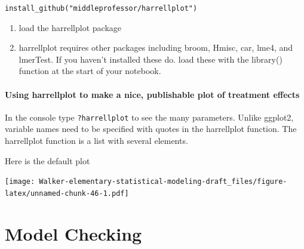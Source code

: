 \documentclass[]{book}
\newenvironment{Shaded}{\begin{snugshade}}{\end{snugshade}}
\newcommand{\KeywordTok}[1]{\textcolor[rgb]{0.13,0.29,0.53}{\textbf{#1}}}
\newcommand{\DataTypeTok}[1]{\textcolor[rgb]{0.13,0.29,0.53}{#1}}
\newcommand{\StringTok}[1]{\textcolor[rgb]{0.31,0.60,0.02}{#1}}
\newcommand{\CommentTok}[1]{\textcolor[rgb]{0.56,0.35,0.01}{\textit{#1}}}
\newcommand{\OperatorTok}[1]{\textcolor[rgb]{0.81,0.36,0.00}{\textbf{#1}}}
\newcommand{\NormalTok}[1]{#1}
\providecommand{\tightlist}{%
  \setlength{\itemsep}{0pt}\setlength{\parskip}{0pt}}
\begin{document}
\texttt{install\_github("middleprofessor/harrellplot")}

\begin{enumerate}
\def\labelenumi{\arabic{enumi}.}
\setcounter{enumi}{2}
\tightlist
\item
  load the harrellplot package
\item
  harrellplot requires other packages including broom, Hmisc, car, lme4,
  and lmerTest. If you haven't installed these do. load these with the
  library() function at the start of your notebook.
\end{enumerate}

\subsubsection{Using harrellplot to make a nice, publishable plot of
treatment
effects}\label{using-harrellplot-to-make-a-nice-publishable-plot-of-treatment-effects}

In the console type \texttt{?harrellplot} to see the many parameters.
Unlike ggplot2, variable names need to be specified with quotes in the
harrellplot function. The harrellplot function is a list with several
elements.

Here is the default plot

\begin{Shaded}
\end{Shaded}

\texttt{[image: Walker-elementary-statistical-modeling-draft\_files/figure-latex/unnamed-chunk-46-1.pdf]}

\chapter{Model Checking}\label{model-checking-1}
\end{document}
